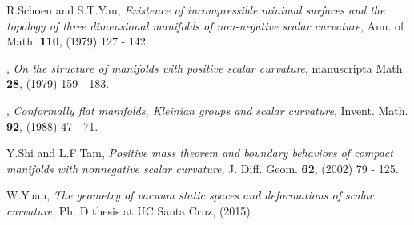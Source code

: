 \documentclass[12pt]{amsart}
\theoremstyle{definition}
\theoremstyle{remark}
\numberwithin{equation}{section}
\begin{document}
\begin{thebibliography}{10}
 R.Schoen and S.T.Yau, \textit{Existence of incompressible minimal surfaces and the topology of three dimensional manifolds of non-negative scalar curvature}, Ann. of Math. \textbf{110}, (1979) 127 - 142. 

 \bysame, \textit{On the structure of manifolds with positive scalar curvature}, manuscripta Math. \textbf{28}, (1979) 159 - 183.

 \bysame, \textit{Conformally flat manifolds, Kleinian groups and scalar curvature}, Invent. Math. \textbf{92}, (1988) 47 - 71.

 Y.Shi and L.F.Tam, \textit{Positive mass theorem and boundary behaviors of compact manifolds with nonnegative scalar curvature}, J. Diff. Geom. \textbf{62}, (2002) 79 - 125.

 W.Yuan, \textit{The geometry of vacuum static spaces and deformations of scalar curvature}, Ph. D thesis at UC Santa Cruz, (2015)
\end{thebibliography}
\end{document}
